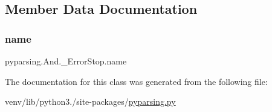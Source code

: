 \subsection{Member Data Documentation}
\mbox{\label{classpyparsing_1_1And_1_1__ErrorStop_ad8f8fbf8ad06bb536844da76737b7df5}} 
\subsubsection{\texorpdfstring{name}{name}}
{\footnotesize\ttfamily pyparsing.\+And.\+\_\+\+Error\+Stop.\+name}



The documentation for this class was generated from the following file\+:\begin{DoxyCompactItemize}
\item 
venv/lib/python3./site-\/packages/\hyperlink{pyparsing_8py}{pyparsing.\+py}\end{DoxyCompactItemize}
